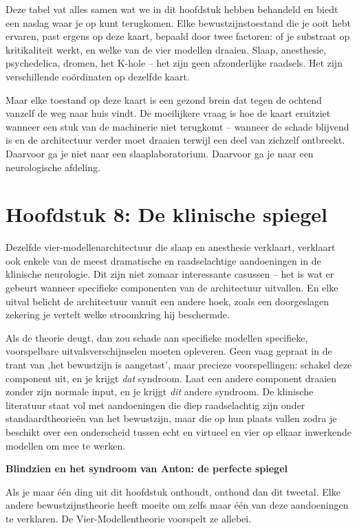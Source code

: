 \documentclass[11pt, twoside, openright]{book}
\begin{document}
Deze tabel vat alles samen wat we in dit hoofdstuk hebben behandeld en biedt een naslag waar je op kunt terugkomen. Elke bewustzijnstoestand die je ooit hebt ervaren, past ergens op deze kaart, bepaald door twee factoren: of je substraat op kritikaliteit werkt, en welke van de vier modellen draaien. Slaap, anesthesie, psychedelica, dromen, het K-hole -- het zijn geen afzonderlijke raadsels. Het zijn verschillende coördinaten op dezelfde kaart.

Maar elke toestand op deze kaart is een gezond brein dat tegen de ochtend vanzelf de weg naar huis vindt. De moeilijkere vraag is hoe de kaart eruitziet wanneer een stuk van de machinerie niet terugkomt -- wanneer de schade blijvend is en de architectuur verder moet draaien terwijl een deel van zichzelf ontbreekt. Daarvoor ga je niet naar een slaaplaboratorium. Daarvoor ga je naar een neurologische afdeling.


\chapter*{Hoofdstuk 8: De klinische spiegel}

Dezelfde vier-modellenarchitectuur die slaap en anesthesie verklaart, verklaart ook enkele van de meest dramatische en raadselachtige aandoeningen in de klinische neurologie. Dit zijn niet zomaar interessante casussen -- het is wat er gebeurt wanneer specifieke componenten van de architectuur uitvallen. En elke uitval belicht de architectuur vanuit een andere hoek, zoals een doorgeslagen zekering je vertelt welke stroomkring hij beschermde.

Als de theorie deugt, dan zou schade aan specifieke modellen specifieke, voorspelbare uitvalsverschijnselen moeten opleveren. Geen vaag gepraat in de trant van ‚het bewustzijn is aangetast', maar precieze voorspellingen: schakel deze component uit, en je krijgt \textit{dat} syndroom. Laat een andere component draaien zonder zijn normale input, en je krijgt \textit{dit} andere syndroom. De klinische literatuur staat vol met aandoeningen die diep raadselachtig zijn onder standaardtheorieën van het bewustzijn, maar die op hun plaats vallen zodra je beschikt over een onderscheid tussen echt en virtueel en vier op elkaar inwerkende modellen om mee te werken.

\textbf{Blindzien en het syndroom van Anton: de perfecte spiegel}

Als je maar één ding uit dit hoofdstuk onthoudt, onthoud dan dit tweetal. Elke andere bewustzijnstheorie heeft moeite om zelfs maar één van deze aandoeningen te verklaren. De Vier-Modellentheorie voorspelt ze allebei.
\end{document}
